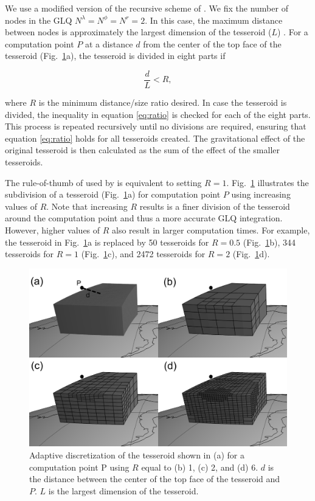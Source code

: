 \documentclass[extra]{gji}
\begin{document}
We use a modified version
of the recursive scheme of \citet{Li2011}.
We fix the number of nodes in the GLQ
$N^\lambda=N^\phi=N^r=2$.
In this case, the maximum distance between nodes
is approximately the largest dimension of the tesseroid ($L$)
\citep{Wild-Pfeiffer2008}.
For a computation point $P$
at a distance $d$ from
the center of the top face of the tesseroid
(Fig.~\ref{fig:ratio}a),
the tesseroid is divided in eight parts if

\begin{equation}
    \frac{d}{L} < R,
    \label{eq:ratio}
\end{equation}

\noindent
where $R$ is the minimum distance/size ratio desired.
In case the tesseroid is divided,
the inequality in equation \ref{eq:ratio}
is checked for each of the eight parts.
This process is repeated recursively
until no divisions are required,
ensuring that equation \ref{eq:ratio}
holds for all tesseroids created.
The gravitational effect
of the original tesseroid
is then calculated as
the sum of the effect
of the smaller tesseroids.

The rule-of-thumb of \citet{Ku1977}
used by \citet{Li2011}
is equivalent to setting $R=1$.
Fig.~\ref{fig:ratio}
illustrates the subdivision of a tesseroid
(Fig.~\ref{fig:ratio}a)
for computation point $P$
using increasing values of $R$.
Note that increasing $R$
results is a finer division of the tesseroid
around the computation point
and thus a more accurate GLQ integration.
However, higher values of $R$
also result in
larger computation times.
For example,
the tesseroid in Fig.~\ref{fig:ratio}a
is replaced by
50 tesseroids for $R=0.5$ (Fig.~\ref{fig:ratio}b),
344 tesseroids for $R=1$ (Fig.~\ref{fig:ratio}c),
and 2472 tesseroids for  $R=2$ (Fig.~\ref{fig:ratio}d).

\begin{figure}
    \centering
    \includegraphics[width=\columnwidth]{figs/tesseroid-split}
    \caption{
        Adaptive discretization
        of the tesseroid shown in (a)
        for a computation point P
        using $R$ equal to
        (b) 1, (c) 2, and (d) 6.
        $d$ is the distance between
        the center of the top face of the tesseroid
        and $P$.
        $L$ is the largest dimension of the tesseroid.
    }
    \label{fig:ratio}
\end{figure}
\end{document}
